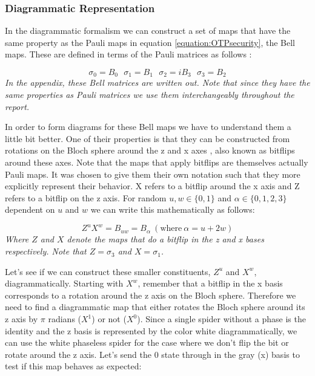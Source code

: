 \documentclass[]{article}
\begin{document}
\subsubsection{Diagrammatic Representation}
\label{DiagramRepresentationQOTP}
In the diagrammatic formalism we can construct a set of maps that have the same property as the Pauli maps in equation \ref{equation:OTPsecurity}, the Bell maps. These are defined in terms of the Pauli matrices as follows \cite{Coecke2017}:

\begin{equation}
	\sigma_0 = B_0 ~~~ \sigma_1 = B_1 ~~~ \sigma_2 = iB_3 ~~~ \sigma_3 = B_2 
\end{equation}
\textit{In the appendix, these Bell matrices are written out. Note that since they have the same properties as Pauli matrices we use them interchangeably throughout the report.}

In order to form diagrams for these Bell maps we have to understand them a little bit better. One of their properties is that they can be constructed from rotations on the Bloch sphere around the z and x axes \cite{DJORDJEVIC2012227}, also known as bitflips around these axes. Note that the maps that apply bitflips are themselves actually Pauli maps. It was chosen to give them their own notation such that they more explicitly represent their behavior. X refers to a bitflip around the x axis and Z refers to a bitflip on the z axis. For random $u, w \in \{0,1\}$ and $\alpha \in \{0,1,2,3\}$ dependent on $u$ and $w$ we can write this mathematically as follows:

\begin{equation}
\label{randombell}
	Z^uX^w = B_{uw} = B_\alpha ~(\text{where}\ \alpha = u + 2w)
\end{equation}
\textit{Where $Z$ and $X$ denote the maps that do a bitflip in the z and x bases respectively. Note that $Z = \sigma_3$ and $X = \sigma_1$.}

Let's see if we can construct these smaller constituents, $Z^u$ and $X^w$, diagrammatically. Starting with $X^w$, remember that a bitflip in the x basis corresponds to a rotation around the z axis on the Bloch sphere. Therefore we need to find a diagrammatic map that either rotates the Bloch sphere around its z axis by $\pi$ radians ($X^1$) or not ($X^0$). Since a single spider without a phase is the identity and the z basis is represented by the color white diagrammatically, we can use the white phaseless spider for the case where we don't flip the bit or rotate around the z axis. Let's send the 0 state through in the gray (x) basis to test if this map behaves as expected:
\end{document}
